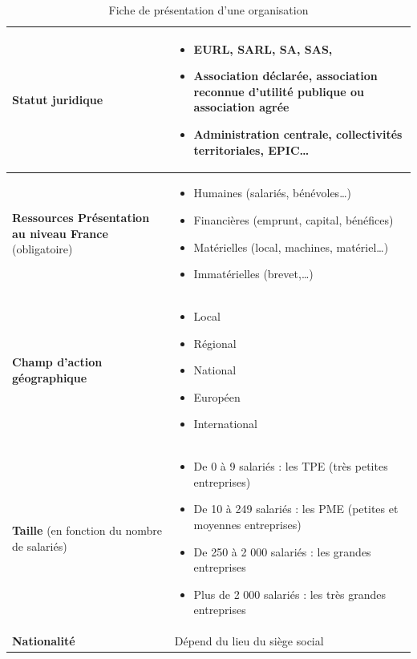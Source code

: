 \documentclass[stage1a]{tnreport} %
\begin{document}
\begin{table}
\begin{tabular}{|p{4cm}|p{13cm}|}
\textbf{Statut juridique} &
\begin{itemize}
 \item EURL,  SARL,  SA,  SAS, 
 \item Association déclarée, association reconnue d’utilité publique ou association agrée
 \item Administration centrale, collectivités territoriales, EPIC\ldots
\end{itemize} \\
\hline

\textbf{Ressources
Présentation au niveau France} (obligatoire) &
\begin{itemize}
 \item Humaines (salariés, bénévoles\ldots)
 \item Financières (emprunt, capital, bénéfices)
 \item Matérielles (local, machines, matériel\ldots)
 \item Immatérielles (brevet,\ldots)
\end{itemize} \\
\hline

\textbf{Champ d’action géographique} &
\begin{itemize}
 \item Local
 \item Régional
 \item National
 \item Européen 
 \item International
\end{itemize} \\
\hline

\textbf{Taille} (en fonction du nombre de salariés) &
\begin{itemize}
 \item De 0 à 9 salariés : les TPE (très petites entreprises)
 \item De 10 à 249 salariés : les PME (petites et moyennes entreprises)
 \item De 250 à 2 000 salariés : les grandes entreprises
 \item Plus de 2 000 salariés : les très grandes entreprises
\end{itemize} \\
\hline

\textbf{Nationalité} & Dépend du lieu du siège social \\

\hline
\end{tabular}
\caption{Fiche de présentation d’une organisation}\label{tab:fiche}
\end{table}
\end{document}
